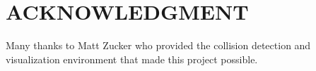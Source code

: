 \documentclass[letterpaper, 10 pt, conference]{ieeeconf}  %
\begin{document}







\section*{ACKNOWLEDGMENT}

Many thanks to Matt Zucker who provided the collision detection and visualization environment that made this project possible.









\end{document}
